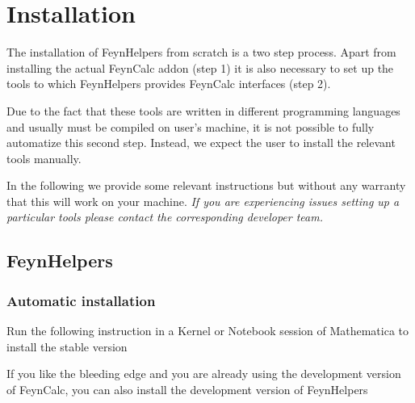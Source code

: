 \documentclass[../FeynHelpersManual.tex]{subfiles}
\begin{document}
\hypertarget{installation}{
\section{Installation}\label{installation}}

The installation of FeynHelpers from scratch is a two step process.
Apart from installing the actual FeynCalc addon (step 1) it is also
necessary to set up the tools to which FeynHelpers provides FeynCalc
interfaces (step 2).

Due to the fact that these tools are written in different programming
languages and usually must be compiled on user's machine, it is not
possible to fully automatize this second step. Instead, we expect the
user to install the relevant tools manually.

In the following we provide some relevant instructions but without any
warranty that this will work on your machine. \emph{If you are
experiencing issues setting up a particular tools please contact the
corresponding developer team.}

\subsection{FeynHelpers}\label{feynhelpers}

\subsubsection{Automatic installation}\label{automatic-installation}

Run the following instruction in a Kernel or Notebook session of
Mathematica to install the stable version

\begin{Shaded}
\begin{Highlighting}[]
\OperatorTok{[}\OperatorTok{]}
\OperatorTok{[]}
\end{Highlighting}
\end{Shaded}

If you like the bleeding edge and you are already using the development
version of FeynCalc, you can also install the development version of
FeynHelpers

\begin{Shaded}
\begin{Highlighting}[]
\OperatorTok{[}\OperatorTok{]}
\OperatorTok{[}\OtherTok{{-}\textgreater{}}\OperatorTok{]}
\end{Highlighting}
\end{Shaded}
\end{document}

